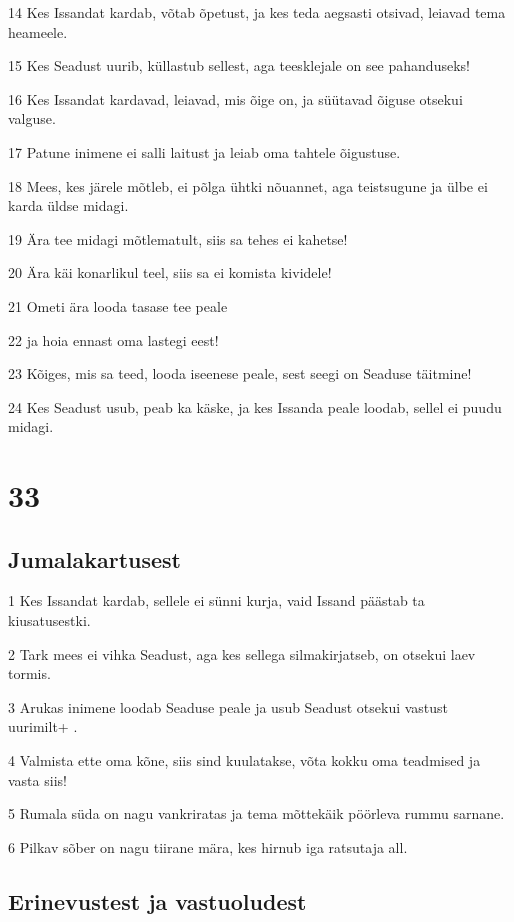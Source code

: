 \par 14 Kes Issandat kardab, võtab õpetust, ja kes teda aegsasti otsivad, leiavad tema heameele.
\par 15 Kes Seadust uurib, küllastub sellest, aga teesklejale on see pahanduseks!
\par 16 Kes Issandat kardavad, leiavad, mis õige on, ja süütavad õiguse otsekui valguse.
\par 17 Patune inimene ei salli laitust ja leiab oma tahtele õigustuse.
\par 18 Mees, kes järele mõtleb, ei põlga ühtki nõuannet, aga teistsugune ja ülbe ei karda üldse midagi.
\par 19 Ära tee midagi mõtlematult, siis sa tehes ei kahetse!
\par 20 Ära käi konarlikul teel, siis sa ei komista kividele!
\par 21 Ometi ära looda tasase tee peale
\par 22 ja hoia ennast oma lastegi eest!
\par 23 Kõiges, mis sa teed, looda iseenese peale, sest seegi on Seaduse täitmine!
\par 24 Kes Seadust usub, peab ka käske, ja kes Issanda peale loodab, sellel ei puudu midagi.

\chapter{33}

\section*{Jumalakartusest}

\par 1 Kes Issandat kardab, sellele ei sünni kurja, vaid Issand päästab ta kiusatusestki.
\par 2 Tark mees ei vihka Seadust, aga kes sellega silmakirjatseb, on otsekui laev tormis.
\par 3 Arukas inimene loodab Seaduse peale ja usub Seadust otsekui vastust uurimilt+ .
\par 4 Valmista ette oma kõne, siis sind kuulatakse, võta kokku oma teadmised ja vasta siis!
\par 5 Rumala süda on nagu vankriratas ja tema mõttekäik pöörleva rummu sarnane.
\par 6 Pilkav sõber on nagu tiirane mära, kes hirnub iga ratsutaja all.

\section*{Erinevustest ja vastuoludest}

